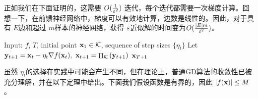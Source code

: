 正如我们在下面证明的，这需要 $O(\frac{1}{\varepsilon^2})$ 迭代，每个迭代都需要一次梯度计算。回想一下，在前馈神经网络中，梯度可以有效地计算，边数是线性的。因此，对于具有 $E$边和超过 $m$样本的神经网络，获得 $\varepsilon$近似解的时间变为$O( \frac{|E| m}{\varepsilon^2}) $。

\begin{algorithm}[h!]
\caption{ 
    梯度下降
    }
\label{alg:BasicGD}
\begin{algorithmic}[1]
\STATE Input: $f$, $T$, initial point $\mathbf x_1 \in \mathcal K$, sequence of step sizes $\{\eta_t\}$
\STATE Let $ \mathbf y_{t+1} = \mathbf x_{t}-\eta_t {\nabla f}(\mathbf x_t) , \  \mathbf x_{t+1}= \mathop{\Pi}_{\mathcal K} \left( \mathbf y_{t+1}  \right) $
\ENDFOR
\RETURN ${\mathbf x}_{T+1} $ 
\end{algorithmic}
\end{algorithm}

虽然 $\eta_t$的选择在实践中可能会产生不同，但在理论上，普通GD算法的收敛性已被充分理解，并在以下定理中给出。下面我们假设函数是有界的，因此 $ |f(\mathbf x) | \leq M$。

